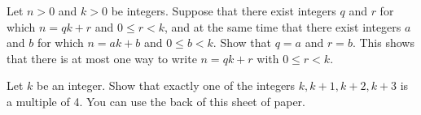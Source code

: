 \yourname


\blist{5.5in}
\item Let $n > 0$ and $k > 0$ be integers.
Suppose that there exist integers $q$ and $r$ for which $n = qk + r$ and $0 \leq r < k$, and at the same time that there exist integers $a$ and $b$ for which $n = ak + b$ and $0 \leq b < k$.
Show that $q = a$ and $r = b$.
This shows that there is at most one way to write $n = qk + r$ with $0 \leq r < k$.

\item Let $k$ be an integer.
Show that exactly one of the integers $k, k+1, k+2, k+3$ is a multiple of 4.
You can use the back of this sheet of paper.
\elist

\vfill          %
